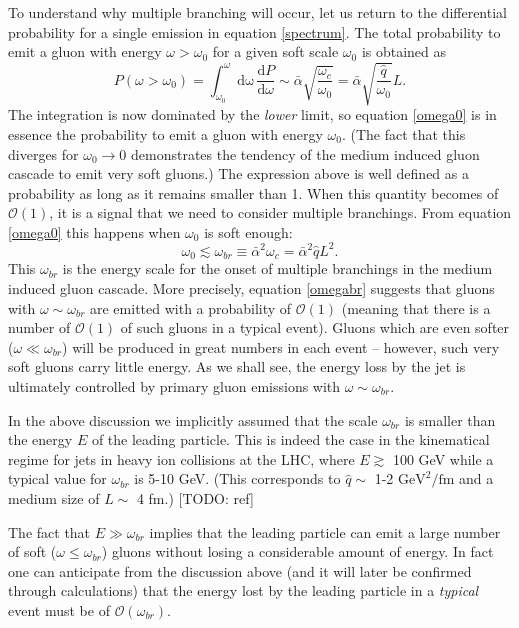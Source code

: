 \documentclass[a4paper,12pt]{article}
\numberwithin{equation}{section}
\begin{document}
To understand why multiple branching will occur, let us return to the differential probability for a single emission in equation \eqref{spectrum}. The total probability to emit a gluon with energy $\omega>\omega_0$ for a given soft scale $\omega_0$ is obtained as
\begin{equation}\label{omega0}
P(\omega>\omega_0)=\int_{\omega_0}^\omega \mathrm{d\omega}\, \frac{\mathrm{d}P}{\mathrm{d}\omega} \sim \bar{\alpha}\sqrt{\frac{\omega_c}{\omega_0}} = \bar{\alpha}\sqrt{\frac{\hat{q}}{\omega_0}}L.
\end{equation}
The integration is now dominated by the \emph{lower} limit, so equation \eqref{omega0} is in essence the probability to emit a gluon with energy $\omega_0$. (The fact that this diverges for $\omega_0 \rightarrow 0$ demonstrates the tendency of the medium induced gluon cascade to emit very soft gluons.) The expression above is well defined as a probability as long as it remains smaller than 1. When this quantity becomes of $\mathcal{O}(1)$, it is a signal that we need to consider multiple branchings. From equation \eqref{omega0} this happens when $\omega_0$ is soft enough: 
\begin{equation}\label{omegabr}
\omega_0 \lesssim \omega_{br} \equiv \bar{\alpha}^2\omega_c=\bar{\alpha}^2 \hat{q} L^2.
\end{equation}
This $\omega_{br}$ is the energy scale for the onset of multiple branchings in the medium induced gluon cascade. More precisely, equation \eqref{omegabr} suggests that gluons with $\omega \sim \omega_{br}$ are emitted with a probability of $\mathcal{O}(1)$ (meaning that there is a number of $\mathcal{O}(1)$ of such gluons in a typical event). Gluons which are even softer ($\omega \ll \omega_{br}$) will be produced in great numbers in each event -- however, such very soft gluons carry little energy. As we shall see, the energy loss by the jet is ultimately controlled by primary gluon emissions with $\omega \sim \omega_{br}$.



In the above discussion we implicitly assumed that the scale $\omega_{br}$ is smaller than the energy $E$ of the leading particle. This is indeed the case in the kinematical regime for jets in heavy ion collisions at the LHC, where $E\gtrsim $ 100 GeV while a typical value for $\omega_{br}$ is 5-10 GeV. (This corresponds to $\hat{q} \sim$ 1-2 $\text{GeV}^2/\text{fm}$ and a medium size of $L\sim$ 4 fm.)
[TODO: ref]

The fact that $E\gg \omega_{br}$ implies that the leading particle can emit a large number of soft ($\omega \leq \omega_{br}$) gluons without losing a considerable amount of energy. In fact one can anticipate from the discussion above (and it will later be confirmed through calculations) that the energy lost by the leading particle in a \emph{typical} event must be of $\mathcal{O}(\omega_{br})$.
\end{document}
